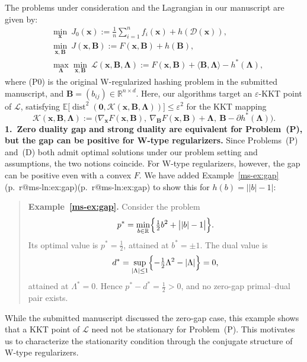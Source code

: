 \documentclass[11pt]{article}
\makeatletter
\newcommand{\mref}[1]{\ref*{ms-#1}}
\newcommand{\mpage}[1]{\pageref*{ms-#1}}
\newcommand{\mhasline}[1]{\ifcsname r@ms-ln:#1\endcsname\expandafter\@firstoftwo\else\expandafter\@secondoftwo\fi}
\newcommand{\mline}[1]{\getrefnumber{ms-ln:#1}}
\newcommand{\mpl}[1]{p.~\mpage{#1}\mhasline{#1}{, line~\mline{#1}}{}}
\newcommand{\RR}{\mathbb{R}}
\newcommand{\EE}{\mathbb{E}}
\newcommand{\dist}{\operatorname{dist}}
\newcommand{\zero}{\bm{0}}
\newcommand{\calD}{\mathcal{D}}
\newcommand{\calL}{\mathcal{L}}
\newcommand{\calK}{\mathcal{K}}
\newcommand{\bB}{\bm{B}}
\newcommand{\bLmbd}{\bm{\Lambda}}
\newcommand{\bx}{\bm{x}}
\newcommand{\blue}[1]{{\ifmmode\color{blue}#1\else\normalfont\upshape\color{blue}#1\fi}}
\newenvironment{bluequote}{\begin{quote}\normalfont\upshape\color{blue}}{\end{quote}}
\newcommand{\newred}[1]{{\color{red}#1}}
\newenvironment{qalist}{\begin{description}[leftmargin=0pt,labelindent=0pt,itemsep=0.8em,parsep=0.5em,font=\normalfont\upshape\bfseries]}{\end{description}}
\makeatother
\begin{document}
\begin{qalist}
The problems under consideration and the Lagrangian in our manuscript are given by:
\begin{align*}
&\min_{\bx}\ J_0(\bx):=\frac1n\sum_{i=1}^n f_i(\bx)+h(\calD(\bx)),\tag{P0}\\
&\min_{\bx,\bB}\ J(\bx,\bB):=F(\bx,\bB)+h(\bB),\tag{P}\\
&\max_{\bLmbd}\min_{\bx,\bB}\ \calL(\bx,\bB,\bLmbd):=F(\bx,\bB)+\langle\bB,\bLmbd\rangle-h^*(\bLmbd),\tag{D}
\end{align*}
where \newred{(P0) is the original W-regularized hashing problem in the submitted manuscript, and} $\bB=(b_{ij})\in\RR^{n\times d}$. Here, our algorithms target an $\varepsilon$-KKT point of $\calL$, satisfying $\EE\big[\dist^2(\zero,\calK(\bx,\bB,\bLmbd))\big]\le\varepsilon^2$ for the KKT mapping
\[
\calK(\bx,\bB,\bLmbd):=\big(\nabla_{\bx}F(\bx,\bB),\ \nabla_{\bB}F(\bx,\bB)+\bLmbd,\ \bB-\partial h^*(\bLmbd)\big).
\]
\textbf{1.~Zero duality gap and strong duality are equivalent for Problem~(P), but the gap can be positive for W-type regularizers.} Since Problems~(P) and~(D) both admit optimal solutions under our problem setting and assumptions, the two notions coincide. For W-type regularizers, however, the gap can be positive even with a convex $F$. We have added Example~\mref{ex:gap} \blue{(\mpl{ex:gap})} to show this for $h(b)=\bigl||b|-1\bigr|$:
\begin{bluequote}
\textbf{Example~\mref{ex:gap}.} Consider the problem
\[
p^*=\min_{b\in\RR}\Bigl\{\tfrac12 b^2+\bigl||b|-1\bigr|\Bigr\}.
\]
Its optimal value is $p^*=\tfrac12$, attained at $b^*=\pm1$. The dual value is
\[
d^*=\sup_{|\Lambda|\le1}\Bigl\{-\tfrac12\Lambda^2-|\Lambda|\Bigr\}=0,
\]
attained at $\Lambda^*=0$. Hence $p^*-d^*=\tfrac12>0$, and no zero-gap primal--dual pair exists.
\end{bluequote}
While the submitted manuscript discussed the zero-gap case, this example shows that a KKT point of $\calL$ need not be stationary for Problem~(P). This motivates us to characterize the stationarity condition through the conjugate structure of W-type regularizers.


\end{qalist}
\end{document}
